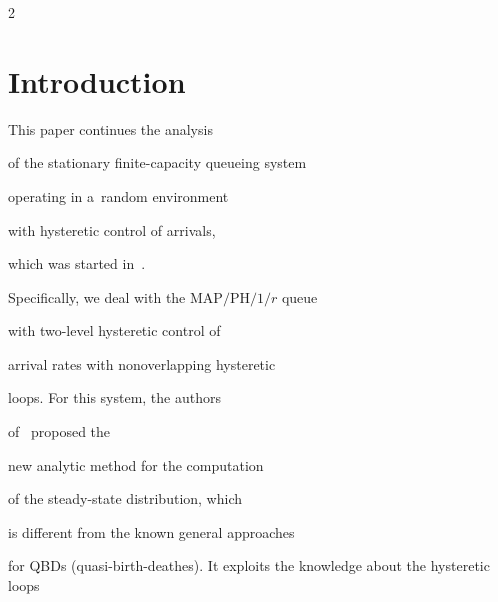 

















      \thispagestyle{myheadings}





      \begin{multicols}{2}





                  \label{st\stat}








\section{Introduction}





\noindent


This paper continues the analysis 


of the stationary finite-capacity queueing system 


operating in a~random environment


with hysteretic control of arrivals, 


which was started in~\cite{int0}.


Specifically, we deal with the $\mathrm{MAP}/\mathrm{PH}/1/r$ queue 


with two-level hysteretic control of 


arrival rates with nonoverlapping hysteretic


loops. For this system, the authors 


of~\cite{int0} proposed the 


new analytic method for the computation 


of the steady-state distribution, which


is different from the known general approaches 


for QBDs (quasi-birth-deathes). It exploits the knowledge about the hysteretic loops 



\end{multicols}
